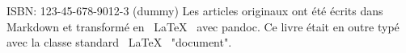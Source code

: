 \mbox{}
\vfill
ISBN: 123-45-678-9012-3 (dummy)
Les articles originaux ont été écrits dans Markdown
et transformé en \ LaTeX \ avec pandoc.
Ce livre était en outre typé avec la classe standard \ LaTeX \ "document".
\doclicenseThis
